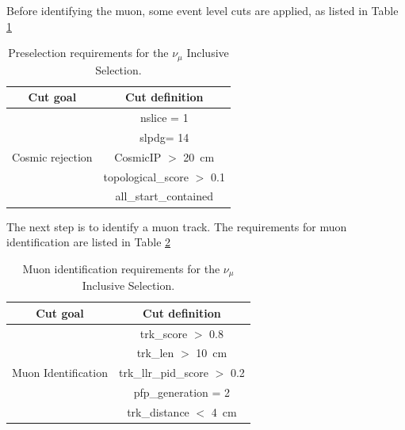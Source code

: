 Before identifying the muon, some event level cuts are applied, as listed in Table \ref{tab:1muNp:preseInclusivel}

\begin{table}[h!]
\centering
\setlength{\tabcolsep}{10pt}
\renewcommand{\arraystretch}{1.25}
 \begin{tabular}{| c | c |} 
 \hline
 Cut goal & Cut definition \\
 \hline\hline
\multirow{5}{*}{ Cosmic rejection } & nslice = 1 \\ & slpdg= 14\\ &CosmicIP $>$ \SI{20}{\cm}\\
& topological\_score $>$ 0.1 \\ &all\_start\_contained\\
 \hline
 \end{tabular}
 \caption{\label{tab:1muNp:preseInclusivel} Preselection requirements for the $\nu_\mu$ Inclusive Selection.}
\end{table}

The next step is to identify a muon track. The requirements for muon identification are listed in Table \ref{tab:1muNp:preseInclusivelMuon}

\begin{table}[h!]
\centering
\setlength{\tabcolsep}{10pt}
\renewcommand{\arraystretch}{1.25}
 \begin{tabular}{| c | c |} 
 \hline
 Cut goal & Cut definition \\
 \hline\hline
\multirow{5}{*}{ Muon Identification } & 
trk\_score $>$ 0.8 \\ &
trk\_len $>$ \SI{10}{\cm} \\ &
trk\_llr\_pid\_score $>$ 0.2\\ &
pfp\_generation = 2  \\ &
trk\_distance $<$ \SI{4}{\cm}\\
 \hline
 \end{tabular}
 \caption{\label{tab:1muNp:preseInclusivelMuon} Muon identification requirements for the $\nu_\mu$ Inclusive Selection.}
\end{table}

